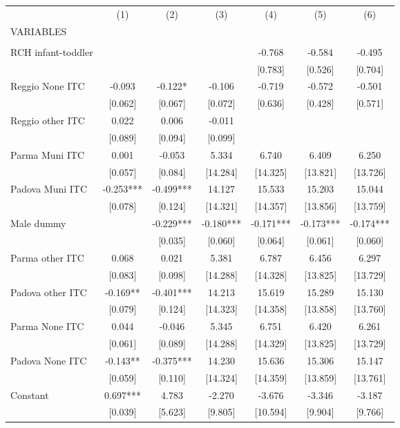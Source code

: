 \begin{tabular}{lcccccc} \hline
 & (1) & (2) & (3) & (4) & (5) & (6) \\
VARIABLES &  &  &  &  &  &  \\ \hline
 &  &  &  &  &  &  \\
RCH infant-toddler &  &  &  & -0.768 & -0.584 & -0.495 \\
 &  &  &  & [0.783] & [0.526] & [0.704] \\
Reggio None ITC & -0.093 & -0.122* & -0.106 & -0.719 & -0.572 & -0.501 \\
 & [0.062] & [0.067] & [0.072] & [0.636] & [0.428] & [0.571] \\
Reggio other ITC & 0.022 & 0.006 & -0.011 &  &  &  \\
 & [0.089] & [0.094] & [0.099] &  &  &  \\
Parma Muni ITC & 0.001 & -0.053 & 5.334 & 6.740 & 6.409 & 6.250 \\
 & [0.057] & [0.084] & [14.284] & [14.325] & [13.821] & [13.726] \\
Padova Muni ITC & -0.253*** & -0.499*** & 14.127 & 15.533 & 15.203 & 15.044 \\
 & [0.078] & [0.124] & [14.321] & [14.357] & [13.856] & [13.759] \\
Male dummy &  & -0.229*** & -0.180*** & -0.171*** & -0.173*** & -0.174*** \\
 &  & [0.035] & [0.060] & [0.064] & [0.061] & [0.060] \\
Parma other ITC & 0.068 & 0.021 & 5.381 & 6.787 & 6.456 & 6.297 \\
 & [0.083] & [0.098] & [14.288] & [14.328] & [13.825] & [13.729] \\
Padova other ITC & -0.169** & -0.401*** & 14.213 & 15.619 & 15.289 & 15.130 \\
 & [0.079] & [0.124] & [14.323] & [14.358] & [13.858] & [13.760] \\
Parma None ITC & 0.044 & -0.046 & 5.345 & 6.751 & 6.420 & 6.261 \\
 & [0.061] & [0.089] & [14.288] & [14.329] & [13.825] & [13.729] \\
Padova None ITC & -0.143** & -0.375*** & 14.230 & 15.636 & 15.306 & 15.147 \\
 & [0.059] & [0.110] & [14.324] & [14.359] & [13.859] & [13.761] \\
Constant & 0.697*** & 4.783 & -2.270 & -3.676 & -3.346 & -3.187 \\
 & [0.039] & [5.623] & [9.805] & [10.594] & [9.904] & [9.766] \\

\end{tabular}
